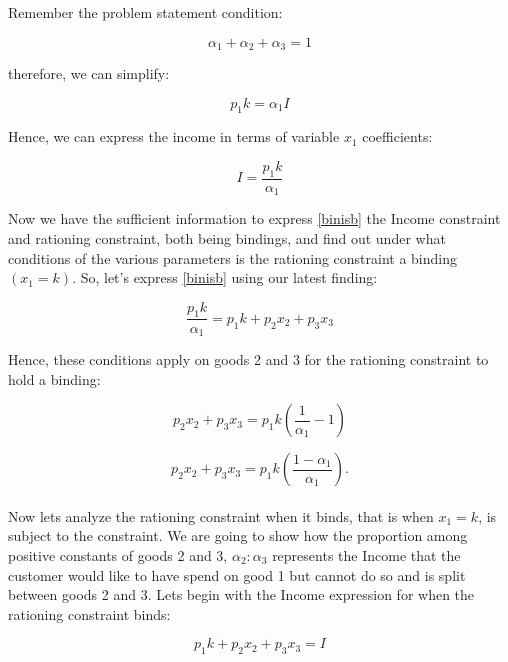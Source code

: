 \documentclass{article}
\begin{document}
Remember the problem statement condition:

\begin{equation}
  \alpha_1 + \alpha_2 + \alpha_3 = 1
\end{equation}

therefore, we can simplify:

\begin{equation}
   p_1k= \alpha_1 I
\end{equation}

Hence, we can express the income in terms of variable $x_1$ coefficients:

\begin{equation}
  I = \frac{p_1 k}{\alpha_1}
\end{equation}

Now we have the sufficient information to express \ref{binisb} the Income constraint and rationing constraint, both being bindings, and find out under what conditions of the various parameters is the rationing constraint a binding $(x_1 = k)$. So, let's express \ref{binisb} using our latest finding:

\begin{equation}
  \frac{p_1 k}{\alpha_1} = p_1 k + p_2 x_2 + p_3 x_3
\end{equation}

Hence, these conditions apply on goods 2 and 3 for the rationing constraint to hold a binding:

\begin{equation}
  p_2 x_2 + p_3 x_3 = p_1 k \left( \frac{1}{\alpha_1} - 1\right)
\end{equation}

\begin{equation}
  p_2 x_2 + p_3 x_3 = p_1 k \left( \frac{1 - \alpha_1}{\alpha_1} \right).
\end{equation}

\paragraph{}
Now lets analyze the rationing constraint when it binds, that is when $x_1 = k$, is subject to the constraint. We are going to show how the proportion among positive constants of goods 2 and 3, $\alpha_2 : \alpha_3$ represents the Income that the customer would like to have spend on good 1 but cannot do so and is split between goods 2 and 3. Lets begin with the Income expression for when the rationing constraint binds:

\begin{equation}\label{binprop}
   p_1k + p_2x_2 + p_3x_3 = I
\end{equation}
\end{document}
